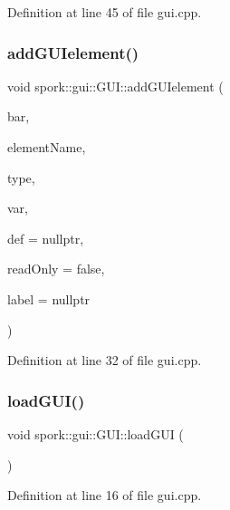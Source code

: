 Definition at line 45 of file gui.\+cpp.

\mbox{\label{classspork_1_1gui_1_1_g_u_i_add55001e7b4f540f80ed915d3588f20f}} 
\subsubsection{\texorpdfstring{add\+G\+U\+Ielement()}{addGUIelement()}}
{\footnotesize\ttfamily void spork\+::gui\+::\+G\+U\+I\+::add\+G\+U\+Ielement (\begin{DoxyParamCaption}\item[{Tw\+Bar $\ast$}]{bar,  }\item[{const char $\ast$}]{element\+Name,  }\item[{Tw\+Type}]{type,  }\item[{void $\ast$}]{var,  }\item[{const char $\ast$}]{def = {\ttfamily nullptr},  }\item[{bool}]{read\+Only = {\ttfamily false},  }\item[{\hyperlink{my_string_8h_afbeda3fd1bdc8c37d01bdf9f5c8274ff}{String}}]{label = {\ttfamily nullptr} }\end{DoxyParamCaption})}



Definition at line 32 of file gui.\+cpp.

\mbox{\label{classspork_1_1gui_1_1_g_u_i_a81feb6b378f67372bb0d888a3e8a9a0c}} 
\subsubsection{\texorpdfstring{load\+G\+U\+I()}{loadGUI()}}
{\footnotesize\ttfamily void spork\+::gui\+::\+G\+U\+I\+::load\+G\+UI (\begin{DoxyParamCaption}{ }\end{DoxyParamCaption})}



Definition at line 16 of file gui.\+cpp.



